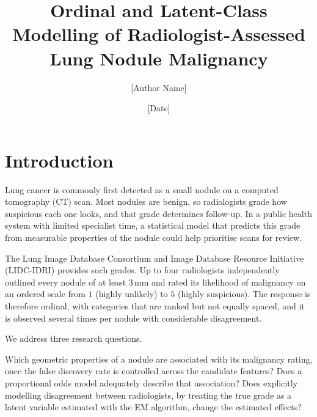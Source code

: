 \documentclass[12pt]{article}
\title{Ordinal and Latent-Class Modelling of Radiologist-Assessed
Lung Nodule Malignancy}
\author{[Author Name]}
\date{[Date]}
\begin{document}

\makecontents

\doublespacing

\section{Introduction}

Lung cancer is commonly first detected as a small nodule on a
computed tomography (CT) scan. Most nodules are benign, so
radiologists grade how suspicious each one looks, and that grade
determines follow-up. In a public health system with limited
specialist time, a statistical model that predicts this grade
from measurable properties of the nodule could help prioritise
scans for review.

The Lung Image Database Consortium and Image Database Resource
Initiative (LIDC-IDRI)\cite{armato2011lidc} provides such grades.
Up to four radiologists independently outlined every nodule of
at least $3$\,mm and rated its likelihood of malignancy on an
ordered scale from $1$ (highly unlikely) to $5$ (highly
suspicious). The response is therefore ordinal, with categories
that are ranked but not equally spaced, and it is observed
several times per nodule with considerable disagreement.

We address three research questions.
\begin{enumerate}
  \ii Which geometric properties of a nodule are associated with
    its malignancy rating, once the false discovery rate is
    controlled across the candidate features?
  \ii Does a proportional odds model\cite{mccullagh1980}
    adequately describe that association?
  \ii Does explicitly modelling disagreement between
    radiologists, by treating the true grade as a latent
    variable estimated with the EM
    algorithm\cite{dempster1977,dawid1979}, change the estimated
    effects?
\end{enumerate}
\end{document}
